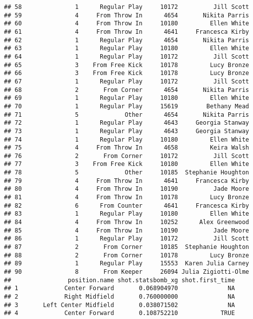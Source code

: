 \documentclass[]{article}
\begin{document}
\begin{verbatim}
## 58               1      Regular Play     10172          Jill Scott
## 59               4     From Throw In      4654       Nikita Parris
## 60               4     From Throw In     10180         Ellen White
## 61               4     From Throw In      4641     Francesca Kirby
## 62               1      Regular Play      4654       Nikita Parris
## 63               1      Regular Play     10180         Ellen White
## 64               1      Regular Play     10172          Jill Scott
## 65               3    From Free Kick     10178         Lucy Bronze
## 66               3    From Free Kick     10178         Lucy Bronze
## 67               1      Regular Play     10172          Jill Scott
## 68               2       From Corner      4654       Nikita Parris
## 69               1      Regular Play     10180         Ellen White
## 70               1      Regular Play     15619        Bethany Mead
## 71               5             Other      4654       Nikita Parris
## 72               1      Regular Play      4643     Georgia Stanway
## 73               1      Regular Play      4643     Georgia Stanway
## 74               1      Regular Play     10180         Ellen White
## 75               4     From Throw In      4658         Keira Walsh
## 76               2       From Corner     10172          Jill Scott
## 77               3    From Free Kick     10180         Ellen White
## 78               5             Other     10185  Stephanie Houghton
## 79               4     From Throw In      4641     Francesca Kirby
## 80               4     From Throw In     10190          Jade Moore
## 81               4     From Throw In     10178         Lucy Bronze
## 82               6      From Counter      4641     Francesca Kirby
## 83               1      Regular Play     10180         Ellen White
## 84               4     From Throw In     10252      Alex Greenwood
## 85               4     From Throw In     10190          Jade Moore
## 86               1      Regular Play     10172          Jill Scott
## 87               2       From Corner     10185  Stephanie Houghton
## 88               2       From Corner     10178         Lucy Bronze
## 89               1      Regular Play     15553  Karen Julia Carney
## 90               8       From Keeper     26094 Julia Zigiotti-Olme
##                position.name shot.statsbomb_xg shot.first_time
## 1             Center Forward       0.068904970              NA
## 2             Right Midfield       0.760000000              NA
## 3       Left Center Midfield       0.038071502              NA
## 4             Center Forward       0.108752210            TRUE

\end{verbatim}
\end{document}
